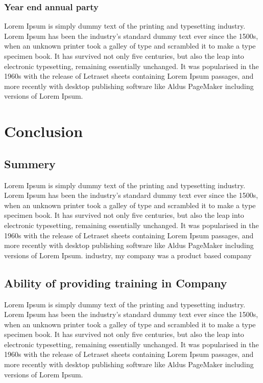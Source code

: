 \documentclass[12pt,a4paper]{report}
\begin{document}
\subsection*{Year end annual party}
Lorem Ipsum is simply dummy text of the printing and typesetting industry. Lorem Ipsum has been the industry's standard dummy text ever since the 1500s, when an unknown printer took a galley of type and scrambled it to make a type specimen book. It has survived not only five centuries, but also the leap into electronic typesetting, remaining essentially unchanged. It was popularised in the 1960s with the release of Letraset sheets containing Lorem Ipsum passages, and more recently with desktop publishing software like Aldus PageMaker including versions of Lorem Ipsum.


\chapter{Conclusion}
\section{Summery}
Lorem Ipsum is simply dummy text of the printing and typesetting industry. Lorem Ipsum has been the industry's standard dummy text ever since the 1500s, when an unknown printer took a galley of type and scrambled it to make a type specimen book. It has survived not only five centuries, but also the leap into electronic typesetting, remaining essentially unchanged. It was popularised in the 1960s with the release of Letraset sheets containing Lorem Ipsum passages, and more recently with desktop publishing software like Aldus PageMaker including versions of Lorem Ipsum. industry, my company was a product based company 
\section{Ability of providing training in Company}
Lorem Ipsum is simply dummy text of the printing and typesetting industry. Lorem Ipsum has been the industry's standard dummy text ever since the 1500s, when an unknown printer took a galley of type and scrambled it to make a type specimen book. It has survived not only five centuries, but also the leap into electronic typesetting, remaining essentially unchanged. It was popularised in the 1960s with the release of Letraset sheets containing Lorem Ipsum passages, and more recently with desktop publishing software like Aldus PageMaker including versions of Lorem Ipsum.
\end{document}
